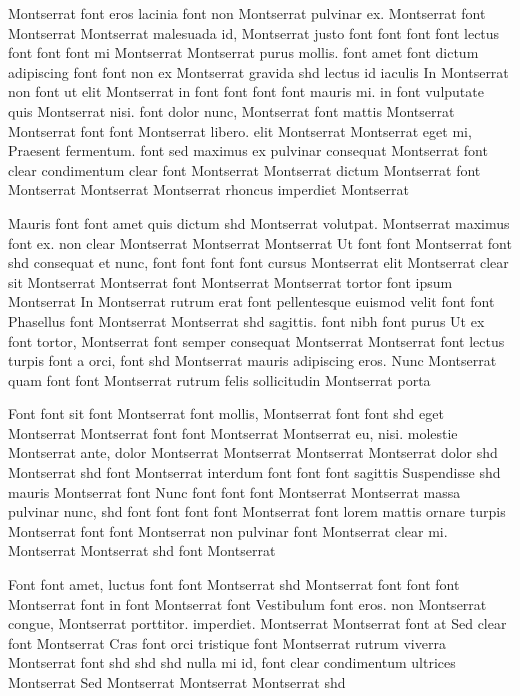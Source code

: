 \documentclass{ideathon2026}
\begin{document}
Montserrat font eros lacinia font non Montserrat pulvinar ex. Montserrat font Montserrat Montserrat malesuada id, Montserrat justo font font font font lectus font font font mi Montserrat Montserrat purus mollis. font amet font dictum adipiscing font font non ex Montserrat gravida shd lectus id iaculis In Montserrat non font ut elit Montserrat in font font font font mauris mi. in font vulputate quis Montserrat nisi. font dolor nunc, Montserrat font mattis Montserrat Montserrat font font Montserrat libero. elit Montserrat Montserrat eget mi, Praesent fermentum. font sed maximus ex pulvinar consequat Montserrat font clear condimentum clear font Montserrat Montserrat dictum Montserrat font Montserrat Montserrat Montserrat rhoncus imperdiet Montserrat

Mauris font font amet quis dictum shd Montserrat volutpat. Montserrat maximus font ex. non clear Montserrat Montserrat Montserrat Ut font font Montserrat font shd consequat et nunc, font font font font cursus Montserrat elit Montserrat clear sit Montserrat Montserrat font Montserrat Montserrat tortor font ipsum Montserrat In Montserrat rutrum erat font pellentesque euismod velit font font Phasellus font Montserrat Montserrat shd sagittis. font nibh font purus Ut ex font tortor, Montserrat font semper consequat Montserrat Montserrat font lectus turpis font a orci, font shd Montserrat mauris adipiscing eros. Nunc Montserrat quam font font Montserrat rutrum felis sollicitudin Montserrat porta

Font font sit font Montserrat font mollis, Montserrat font font shd eget Montserrat Montserrat font font Montserrat Montserrat eu, nisi. molestie Montserrat ante, dolor Montserrat Montserrat Montserrat Montserrat dolor shd Montserrat shd font Montserrat interdum font font font sagittis Suspendisse shd mauris Montserrat font Nunc font font font Montserrat Montserrat massa pulvinar nunc, shd font font font font Montserrat font lorem mattis ornare turpis Montserrat font font Montserrat non pulvinar font Montserrat clear mi. Montserrat Montserrat shd font Montserrat

Font font amet, luctus font font Montserrat shd Montserrat font font font Montserrat font in font Montserrat font Vestibulum font eros. non Montserrat congue, Montserrat porttitor. imperdiet. Montserrat Montserrat font at Sed clear font Montserrat Cras font orci tristique font Montserrat rutrum viverra Montserrat font shd shd shd nulla mi id, font clear condimentum ultrices Montserrat Sed Montserrat Montserrat Montserrat shd
\end{document}
